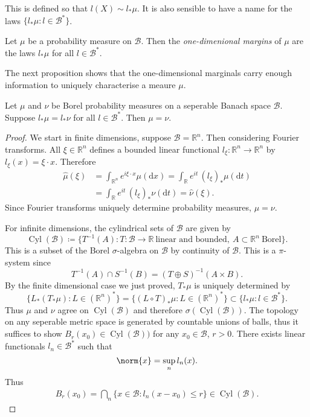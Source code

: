 \documentclass[fontsize=12pt, DIV=10]{scrreprt}
\theoremstyle{remark}
\newcommand{\defeq}{\coloneqq}
\newcommand{\R}{\mathbb R}
\newcommand{\calB}{\mathcal B}
\newcommand{\dif}[1]{\text{d} #1}
\DeclareMathOperator{\cyl}{Cyl}
\begin{document}
This is defined so that $l(X) \sim l_* \mu$. It is also sensible to have a name for the laws $\{l_* \mu : l \in \calB^*\}$.
\begin{defn}
	Let $\mu$ be a probability measure on $\calB$. Then the \emph{one-dimenional margins} of $\mu$ are the laws $l_* \mu$ for all $l \in \calB^*$.
\end{defn}

The next proposition shows that the one-dimensional marginals carry enough information to uniquely characterise a meaure $\mu$.
\begin{prop}
	\label{prop:one-dim-marginals}
	Let $\mu$ and $\nu$ be Borel probability measures on a seperable Banach space $\calB$. Suppose $l_* \mu = l_* \nu$ for all $l \in \calB^*$. Then $\mu = \nu$.
\end{prop}
\begin{proof}
	We start in finite dimensions, suppose $\calB = \R^n$. Then considering Fourier transforms. All $\xi \in \R^n$ defines a bounded linear functional $l_{\xi}: \R^n \to \R^n$ by $l_{\xi}(x) = \xi \cdot x$. Therefore
	\begin{align}
		\hat{\mu}(\xi)
		&= \int_{\R^n} e^{i \xi \cdot x} \mu(\dif x)
		= \int_{\R} e^{i t} \, (l_{\xi})_*\mu(\dif t) \\
		&= \int_{\R} e^{i t} \, (l_{\xi})_*\nu(\dif t)
		= \hat{\nu}(\xi).
	\end{align}
	Since Fourier transforms uniquely determine probability measures, $\mu = \nu$.
	
	For infinite dimensions, the cylindrical sets of $\calB$ are given by
	\begin{equation}
		\cyl(\calB) \defeq \{T^{-1}(A) : T: \calB \to \R\ \text{linear and bounded},\ A \subset \R^n\ \text{Borel}\}.
	\end{equation}
	This is a subset of the Borel $\sigma$-algebra on $\calB$ by continuity of $\calB$. This is a $\pi$-system since 
	\begin{equation}
		T^{-1}(A) \cap S^{-1}(B) = (T \oplus S)^{-1}(A \times B).
	\end{equation}
	By the finite dimensional case we just proved, $T_* \mu$ is uniquely determined by
	\begin{equation}
		\{L_*(T_* \mu) : L \in (\R^n)^* \} = \{ (L \circ T)_* \mu : L \in (\R^n)^* \}
		\subset \{l_* \mu : l \in \calB^*\}.
	\end{equation}
	Thus $\mu$ and $\nu$ agree on $\cyl(\calB)$ and therefore $\sigma(\cyl(\calB))$. The topology on any seperable metric space is generated by countable unions of balls, thus it suffices to show $B_r(x_0) \in \cyl(\calB))$ for any $x_0 \in \calB$, $r > 0$. There exists linear functionals $l_n \in \calB^*$ such that 
	\begin{equation}
		\norm{x} = \sup_n l_n(x).
	\end{equation}
	Thus
	\begin{align}
		B_r(x_0) = \bigcap_n \{x \in \calB : l_n(x - x_0) \leq r \} \in \cyl(\calB).
	\end{align}
\end{proof}
\end{document}
